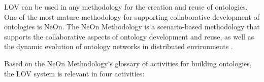 \documentclass{iosart2c}
\begin{document}
LOV can be used in any methodology for the creation and reuse of ontologies. One of the most mature methodology for supporting collaborative development of ontologies is NeOn.  
The NeOn Methodology is a scenario-based methodology that supports the collaborative aspects of ontology development and reuse, as well as the dynamic evolution of ontology networks in distributed environments \cite{MC10}. 

Based on the NeOn Methodology's glossary of activities for building ontologies, the LOV system is relevant in four activities:
\end{document}
